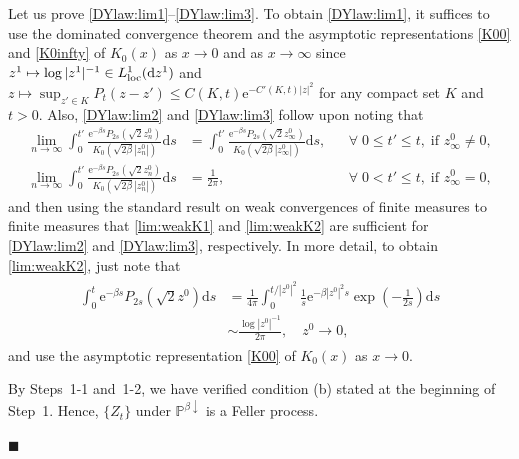 \documentclass[12pt, twoside]{article}
\numberwithin{figure}{section}
\newcommand{\e}{{\mathrm e}}
\newcommand{\1}{\mathds 1}
\newcommand{\da}{{\downarrow}}
\renewcommand{\P}{{\mathbb P}}
\renewcommand{\d}{{\mathrm d}}
\newcommand{\2}{{\mathbf 1}}
\renewenvironment{proof}[1][\proofname]{\noindent {\bfseries #1.}\;}{\hfill\ensuremath{\blacksquare}\\}
\newcommand{\two}{{\sqrt{2}}}
\newcommand{\loc}{{\rm loc}}
\begin{document}
\begin{proof}[Proof of Theorem~\ref{thm:formulas}]
Let us prove \eqref{DYlaw:lim1}--\eqref{DYlaw:lim3}. 
To obtain \eqref{DYlaw:lim1}, it suffices to use the dominated convergence theorem and the asymptotic representations \eqref{K00} and \eqref{K0infty} of $K_0(x)$ as $x\to 0$ and as $x\to\infty$ since $z^1\mapsto \log|z^1|^{-1}\in L^1_\loc(\d z^1)$ and $z\mapsto \sup_{z'\in K}P_t(z-z')\leq C(K,t)\e^{-C'(K,t)|z|^2}$ for any compact set $K$ and $t>0$. Also, \eqref{DYlaw:lim2} and \eqref{DYlaw:lim3} follow upon noting that
\begin{align}
\lim_{n\to\infty}\int_0^{t'}\frac{\e^{-\beta s}P_{2s}(\two z^0_n)}{K_0(\sqrt{2\beta}|z^0_n|)}\d s&=\int_0^{t'}\frac{\e^{-\beta s}P_{2s}(\two z^0_\infty)}{K_0(\sqrt{2\beta}|z^0_\infty|)}\d s,&& \forall\;0\leq t'\leq t,\;\mbox{if }z^0_\infty\neq 0 ,\label{lim:weakK1}\\
\lim_{n\to\infty}\int_0^{t'}\frac{\e^{-\beta s}P_{2s}(\two z^0_n)}{K_0(\sqrt{2\beta}|z^0_n|)}\d s&=\frac{1}{2\pi},&& \forall\;0<t'\leq t,\;\mbox{if }z^0_\infty= 0, \label{lim:weakK2}
\end{align}
and then using the standard result on weak convergences of finite measures to finite measures 
\cite[Theorem~2.8.4, p.124]{Ash} that \eqref{lim:weakK1} and \eqref{lim:weakK2} are sufficient for \eqref{DYlaw:lim2} and \eqref{DYlaw:lim3}, respectively. In more detail, to obtain \eqref{lim:weakK2}, just note that
\begin{align}\label{DYlaw:lim-delta}
\begin{split}
\int_0^t \e^{-\beta s}P_{2s}(\two z^0)\d s&=\frac{1}{4\pi}\int_0^{t/|z^0|^2}\frac{1}{s}\e^{-\beta |z^0|^2 s}\exp\left(-\frac{1}{2s}\right)\d s\\
&\sim \frac{\log |z^0|^{-1}}{2\pi},\quad z^0\to 0,
\end{split}
\end{align}
and use the asymptotic representation \eqref{K00} of $K_0(x)$ as $x\to 0$. 

By Steps~1-1 and~1-2, we have verified condition (b) stated at the beginning of Step~1. Hence, $\{Z_t\}$ under $\P^{\beta\da}$ is a Feller process.\smallskip 


\end{proof}
\end{document}
